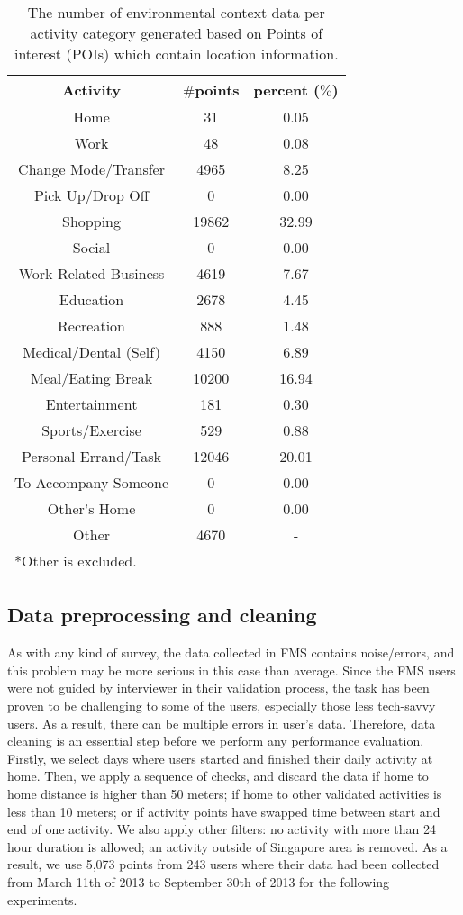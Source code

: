 \documentclass{sig-alternate}
\begin{document}
\begin{table}[htb]
\scriptsize
\caption{The number of environmental context data per activity category generated based on Points of interest (POIs) which contain location information.  } \label{table:poi}
\centering
\begin{tabular}{c c c}
\toprule
Activity & $\#$points & percent ($\%$) \\
\midrule
Home & 31 & 0.05 \\
Work & 48 & 0.08 \\
Change Mode/Transfer & 4965 & 8.25 \\
Pick Up/Drop Off & 0 & 0.00 \\
Shopping & 19862 & 32.99 \\
Social & 0 & 0.00 \\
Work-Related Business & 4619 & 7.67 \\
Education & 2678 & 4.45 \\
Recreation & 888 & 1.48 \\
Medical/Dental (Self) & 4150 & 6.89 \\
Meal/Eating Break & 10200 & 16.94 \\
Entertainment & 181 & 0.30 \\
Sports/Exercise & 529 & 0.88 \\
Personal Errand/Task & 12046 & 20.01 \\
To Accompany Someone & 0 & 0.00 \\
Other's Home & 0 & 0.00 \\
Other &	4670 & -\\
\bottomrule
\multicolumn{2}{l}{*Other is excluded.   }\\

\end{tabular}
\end{table}


\subsection{Data preprocessing and cleaning}
As with any kind of survey, the data collected in FMS contains noise/errors, and this problem may be more serious in this case than average. Since the FMS users were not guided by interviewer in their validation process, the task has been proven to be challenging to some of the users, especially those less tech-savvy users. As a result, there can be multiple errors in user's data. Therefore, data cleaning is an essential step before we perform any performance evaluation. Firstly, we select days where users started and finished their daily activity at home. Then, we apply a sequence of checks, and discard the data if home to home distance is higher than 50 meters; if home to other validated activities is less than 10 meters; or if activity points have swapped time between start and end of one activity. We also apply other filters: no activity with more than 24 hour duration is allowed; an activity outside of Singapore area is removed. As a result, we use 5,073 points from 243 users where their data had been collected from March 11th of 2013 to September 30th of 2013  for the following experiments.
\end{document}
